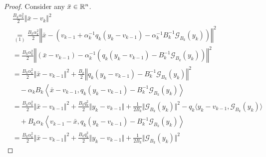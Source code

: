 \documentclass[12pt]{article}
\begin{document}
        \begin{proof}
            Consider any $\bar x \in \mathbb R^n$. 
            \begin{align*}
                & \frac{B_k\alpha_k^2}{2}\Vert \bar x - v_k\Vert^2 
                \\
                &\underset{(1)}{=} \frac{B_k\alpha_k^2}{2}\left\Vert
                    \bar x - 
                    \left(
                        v_{k - 1} 
                        + \alpha_k^{-1}q_k(y_k - v_{k - 1})
                        - \alpha_k^{-1} B_k^{-1} \mathcal G_{B_k}(y_k)
                    \right)
                \right\Vert^2
                \\
                &= \frac{B_k\alpha_k^2}{2}\left\Vert
                    (\bar x - v_{k - 1})
                    - \alpha_k^{-1}\left(
                        q_k(y_k - v_{k - 1})
                        -  B_k^{-1} \mathcal G_{B_k}(y_k)
                    \right)
                \right\Vert^2
                \\
                &= \frac{B_k\alpha_k^2}{2}
                \Vert \bar x - v_{k - 1}\Vert^2
                + \frac{B_k}{2}\left\Vert 
                    q_k(y_k - v_{k - 1})
                    -  B_k^{-1} \mathcal G_{B_k}(y_k)
                \right\Vert^2
                    \\ &\quad 
                    - \alpha_k B_k
                    \left\langle 
                        \bar x - v_{k - 1}, 
                        q_k(y_k - v_{k - 1}) - B_k^{-1}\mathcal G_{B_k}(y_k)
                    \right\rangle
                \\
                &= 
                \frac{B_k\alpha_k^2}{2}
                \Vert \bar x - v_{k - 1}\Vert^2
                + \frac{B_kq_k^2}{2}\Vert y_k - v_{k - 1} \Vert
                + \frac{1}{2B_k}\Vert \mathcal G_{B_k}(y_k)\Vert^2
                - q_k\langle 
                    y_k - v_{k - 1}, \mathcal G_{B_k}(y_k)
                \rangle
                    \\ &\quad 
                    + B_k\alpha_k
                    \left\langle 
                        v_{k - 1} - \bar x, 
                        q_k(y_k - v_{k - 1}) - B_k^{-1}\mathcal G_{B_k}(y_k)
                    \right\rangle
                \\
                &= 
                \frac{B_k\alpha_k^2}{2}
                \Vert \bar x - v_{k - 1}\Vert^2
                + \frac{B_kq_k^2}{2}\Vert y_k - v_{k - 1} \Vert
                + \frac{1}{2B_k}\Vert \mathcal G_{B_k}(y_k)\Vert^2

\end{align*}
\end{proof}
\end{document}
